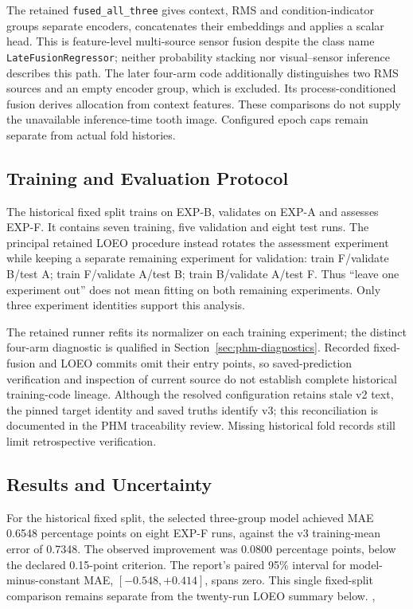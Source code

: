 The retained \texttt{fused\_all\_three} gives context, RMS and condition-indicator
groups separate encoders, concatenates their embeddings and applies a scalar head. This
is feature-level multi-source sensor fusion despite the class name
\texttt{LateFusionRegressor}; neither probability stacking nor visual--sensor inference
describes this path. The later four-arm code additionally distinguishes two RMS sources
and an empty encoder group, which is excluded. Its process-conditioned fusion derives
allocation from context features. These comparisons do not supply the unavailable
inference-time tooth image. Configured epoch caps remain separate from actual fold
histories.

\subsection{Training and Evaluation Protocol}
The historical fixed split trains on EXP-B, validates on EXP-A and assesses EXP-F. It
contains seven training, five validation and eight test runs. The principal retained
LOEO procedure instead rotates the assessment experiment while keeping a separate
remaining experiment for validation: train F/validate B/test A; train F/validate A/test
B; train B/validate A/test F. Thus ``leave one experiment out'' does not mean fitting on
both remaining experiments. Only three experiment identities support this analysis.

The retained runner refits its normalizer on each training experiment; the distinct
four-arm diagnostic is qualified in Section~\ref{sec:phm-diagnostics}. Recorded fixed-fusion
and LOEO commits omit their entry points, so saved-prediction verification and inspection
of current source do not establish complete historical training-code lineage. Although
the resolved configuration retains stale v2 text, the pinned target identity and saved
truths identify v3; this reconciliation is documented in the PHM traceability review.
Missing historical fold records still limit retrospective verification.

\subsection{Results and Uncertainty}
For the historical fixed split, the selected three-group model achieved MAE 0.6548
percentage points on eight EXP-F runs, against the v3 training-mean error of 0.7348.
The observed improvement was 0.0800 percentage points, below the declared 0.15-point
criterion. The report's paired 95\% interval for model-minus-constant MAE,
$[-0.548,+0.414]$, spans zero. This single fixed-split comparison remains separate
from the twenty-run LOEO summary below.
{, }


